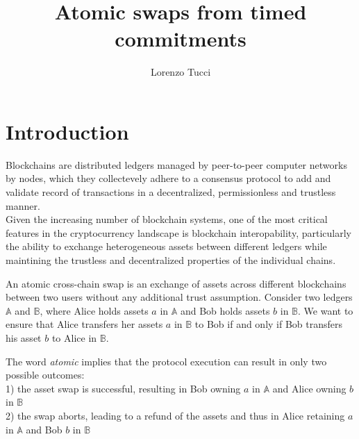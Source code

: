\documentclass{article}      	%
\begin{document}
         
\author{Lorenzo Tucci}
\title{Atomic swaps from timed commitments}

\maketitle

\tableofcontents
\section{Introduction}

Blockchains are distributed ledgers managed by peer-to-peer computer networks by nodes, which they collectevely adhere to a consensus protocol to add and validate record of transactions in a decentralized, permissionless and trustless manner. \\
Given the increasing number of blockchain systems, one of the most critical features in the cryptocurrency landscape is blockchain interopability, particularly the ability to exchange heterogeneous assets between different ledgers while maintining the trustless and decentralized properties of the individual chains. 

An atomic cross-chain swap is an exchange of assets across different blockchains between two users without any additional trust assumption. 
Consider two ledgers $\mathbb{A}$ and $\mathbb{B}$, where Alice holds assets $a$ in $\mathbb{A}$ and Bob holds assets $b$ in $\mathbb{B}$. We want to ensure that Alice transfers her assets $a$ in $\mathbb{B}$ to Bob if and only if Bob transfers his asset $b$ to Alice in $\mathbb{B}$.

The word \textit{atomic} implies that the protocol execution can result in only two possible outcomes: \\
1) the asset swap is successful, resulting in Bob owning $a$ in $\mathbb{A}$ and Alice owning $b$ in $\mathbb{B}$ \\
2) the swap aborts, leading to a refund of the assets and thus in Alice retaining $a$ in $\mathbb{A}$ and Bob $b$ in $\mathbb{B}$ 
\end{document}
